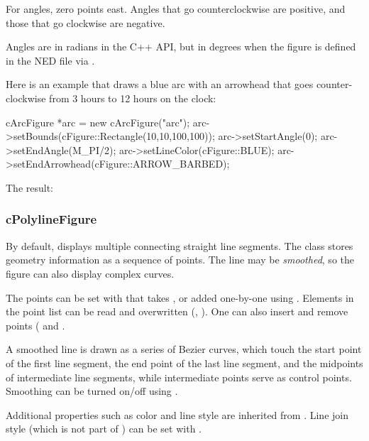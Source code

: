 For angles, zero points east. Angles that go counterclockwise are
positive, and those that go clockwise are negative.

\begin{note}
Angles are in radians in the C++ API, but in degrees when the figure is
defined in the NED file via .
\end{note}

Here is an example that draws a blue arc with an arrowhead that goes
counter-clockwise from 3 hours to 12 hours on the clock:

\begin{cpp}
cArcFigure *arc = new cArcFigure("arc");
arc->setBounds(cFigure::Rectangle(10,10,100,100));
arc->setStartAngle(0);
arc->setEndAngle(M_PI/2);
arc->setLineColor(cFigure::BLUE);
arc->setEndArrowhead(cFigure::ARROW_BARBED);
\end{cpp}


The result:

\begin{center}

\end{center}


\subsubsection{cPolylineFigure}
\label{sec:graphics:polylinefigure}

By default,  displays multiple connecting straight
line segments. The class stores geometry information as a sequence of
points. The line may be \textit{smoothed}, so the figure can also display
complex curves.

The points can be set with  that takes ,
or added one-by-one using . Elements in the point list can be
read and overwritten (, ). One can also
insert and remove points ( and .

A smoothed line is drawn as a series of Bezier curves, which touch the
start point of the first line segment, the end point of the last line
segment, and the midpoints of intermediate line segments, while
intermediate points serve as control points. Smoothing can be turned on/off
using .

Additional properties such as color and line style are inherited from
. Line join style (which is not part of
) can be set with .

